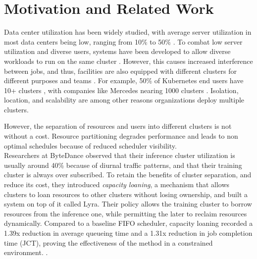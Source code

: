 \section{Motivation and Related Work}
Data center utilization has been widely studied, with average server utilization in most data centers being low, 
ranging from 10\% to 50\%
\cite{lo_heracles_2015}. 
To combat low server utilization and diverse users, systems have been developed to allow diverse workloads to run 
on the same cluster \cite{bhattacharya_hierarchical_2013, hindman_mesos_nodate}. 
However, this causes increased interference between jobs, and thus, 
facilities are also equipped with different clusters for different purposes and teams \cite{patel_what_2022, li_lyra_2023}. 
For example, 50\% of Kubernetes \cite{verma_large-scale_2015}
end users have 10+ clusters \cite{noauthor_cncf_2023} 
, with companies like Mercedes nearing 1000 clusters \cite{noauthor_mercedes-benz_2023}.
Isolation, location, and scalability are among other reasons organizations deploy multiple clusters.

However, the separation of resources and users into different clusters is not without a cost. 
Resource partitioning degrades performance %
and leads to non optimal schedules because of reduced scheduler visibility.\\ %
Researchers at ByteDance observed that their inference cluster utilization is usually around 40\% because 
of diurnal traffic patterns, and that their training cluster is always over subscribed. 
To retain the benefits of cluster separation, and reduce its cost, they introduced \textit{capacity loaning}, 
a mechanism that allows clusters to loan resources to other clusters without losing ownership, and built a system on top 
of it called Lyra.
Their policy allows the training cluster to borrow resources from the inference one, while permitting the 
later to reclaim resources dynamically. 
Compared to a baseline FIFO scheduler, capacity loaning recorded a 1.39x reduction in average queueing time and a 1.31x 
reduction in job completion time (JCT), proving the effectiveness of the method in a constrained environment. \cite{li_lyra_2023}.

